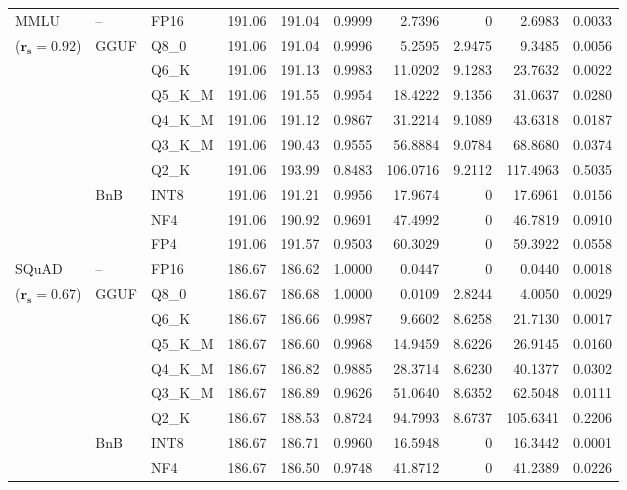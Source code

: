 \begin{longtable}{ll l rrrrrrr}
\midrule
MMLU & -- & FP16 & 191.06 & 191.04 & 0.9999 & 2.7396 & \cellcolor{cyan!12} $0$ & 2.6983 & 0.0033 \\
{\small ($\mathbf{r_s{=}0.92}$)} & GGUF & Q8\_0 & 191.06 & 191.04 & 0.9996 & 5.2595 & 2.9475 & 9.3485 & 0.0056 \\
 &  & Q6\_K & 191.06 & 191.13 & 0.9983 & 11.0202 & 9.1283 & 23.7632 & 0.0022 \\
 &  & Q5\_K\_M & 191.06 & 191.55 & 0.9954 & 18.4222 & 9.1356 & 31.0637 & 0.0280 \\
 &  & Q4\_K\_M & 191.06 & 191.12 & 0.9867 & 31.2214 & 9.1089 & 43.6318 & 0.0187 \\
 &  & Q3\_K\_M & 191.06 & 190.43 & 0.9555 & 56.8884 & 9.0784 & 68.8680 & 0.0374 \\
 &  & Q2\_K & 191.06 & 193.99 & \cellcolor{red!18} 0.8483 & \cellcolor{red!18} 106.0716 & 9.2112 & \cellcolor{red!18} 117.4963 & \cellcolor{red!18} 0.5035 \\
 & BnB & INT8 & 191.06 & 191.21 & 0.9956 & 17.9674 & \cellcolor{cyan!12} $0$ & 17.6961 & 0.0156 \\
 &  & NF4 & 191.06 & 190.92 & 0.9691 & 47.4992 & \cellcolor{cyan!12} $0$ & 46.7819 & 0.0910 \\
 &  & FP4 & 191.06 & 191.57 & 0.9503 & 60.3029 & \cellcolor{cyan!12} $0$ & 59.3922 & 0.0558 \\
\midrule
SQuAD & -- & FP16 & 186.67 & 186.62 & 1.0000 & 0.0447 & \cellcolor{cyan!12} $0$ & 0.0440 & 0.0018 \\
{\small ($\mathbf{r_s{=}0.67}$)} & GGUF & Q8\_0 & 186.67 & 186.68 & 1.0000 & 0.0109 & 2.8244 & 4.0050 & 0.0029 \\
 &  & Q6\_K & 186.67 & 186.66 & 0.9987 & 9.6602 & 8.6258 & 21.7130 & 0.0017 \\
 &  & Q5\_K\_M & 186.67 & 186.60 & 0.9968 & 14.9459 & 8.6226 & 26.9145 & 0.0160 \\
 &  & Q4\_K\_M & 186.67 & 186.82 & 0.9885 & 28.3714 & 8.6230 & 40.1377 & 0.0302 \\
 &  & Q3\_K\_M & 186.67 & 186.89 & 0.9626 & 51.0640 & 8.6352 & 62.5048 & 0.0111 \\
 &  & Q2\_K & 186.67 & 188.53 & \cellcolor{red!18} 0.8724 & \cellcolor{red!18} 94.7993 & 8.6737 & \cellcolor{red!18} 105.6341 & \cellcolor{red!18} 0.2206 \\
 & BnB & INT8 & 186.67 & 186.71 & 0.9960 & 16.5948 & \cellcolor{cyan!12} $0$ & 16.3442 & 0.0001 \\
 &  & NF4 & 186.67 & 186.50 & 0.9748 & 41.8712 & \cellcolor{cyan!12} $0$ & 41.2389 & 0.0226 \\

\end{longtable}
